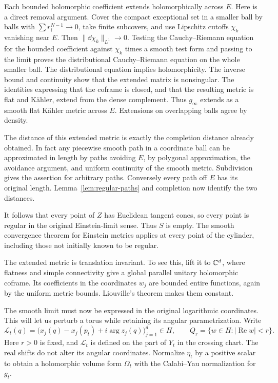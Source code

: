 Each bounded holomorphic coefficient extends holomorphically
across $E$. Here is a direct removal argument. Cover the compact
exceptional set in a smaller ball by balls with
$\sum r_i^{N-1}\to0$, take finite subcovers, and use Lipschitz
cutoffs $\chi_k$ vanishing near $E$.
Then $\|\dd\chi_k\|_{L^1}\to0$. Testing the
Cauchy--Riemann equation for the bounded coefficient against
$\chi_k$ times a smooth test form and passing to the limit proves
the distributional Cauchy--Riemann equation on the whole smaller
ball. The distributional equation implies holomorphicity.
The inverse bound and continuity show that the extended matrix
is nonsingular. The identities expressing that the coframe is
closed, and that the resulting metric is flat and K\"ahler,
extend from the dense complement. Thus $g_\infty$ extends as a
smooth flat K\"ahler metric across $E$. Extensions on overlapping
balls agree by density.

The distance of this extended metric is exactly the completion
distance already obtained. In fact any piecewise smooth path in
a coordinate ball can be approximated in length by paths
avoiding $E$, by polygonal approximation, the avoidance argument,
and uniform continuity of the smooth metric. Subdivision gives
the assertion for arbitrary paths. Conversely every path off
$E$ has its original length. Lemma~\ref{lem:regular-paths} and
completion now identify the two distances.

It follows that every point of $Z$ has Euclidean tangent cones,
so every point is regular in the original Einstein-limit sense.
Thus $S$ is empty. The smooth convergence theorem for Einstein
metrics applies at every point of the cylinder, including those
not initially known to be regular.

The extended metric is translation invariant. To see this, lift
it to $\mathbb C^d$, where flatness and simple connectivity give a global
parallel unitary holomorphic coframe. Its coefficients in the
coordinates $w_j$ are bounded entire functions, again by the
uniform metric bounds. Liouville's theorem makes them constant.

The smooth limit must now be expressed in the original logarithmic
coordinates. This will let us perturb a torus while retaining its
angular parametrization. Write
\[
 \mathcal L_t(q)=\bigl(x_j(q)-x_j(p_t)+i\arg z_j(q)\bigr)_{j=1}^d
       \in H,
 \qquad Q_r=\{w\in H:|\operatorname{Re}w|<r\}.
\]
Here $r>0$ is fixed, and $\mathcal L_t$ is defined on the part of $Y_t$
in the crossing chart. The real shifts do not alter its angular
coordinates. Normalize $\eta_t$ by a positive scalar to obtain a
holomorphic volume form $\Omega_t$ with the Calabi--Yau normalization
for $g_t$.


